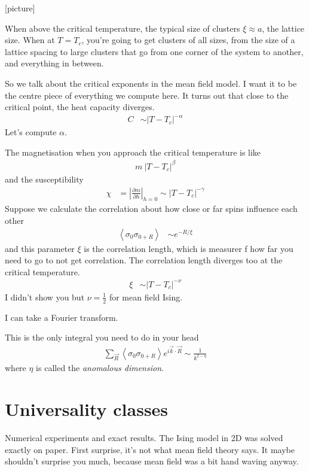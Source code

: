 [picture]

When above the critical temperature,
the typical size of clusters $\xi\approx a$,
the lattice size.
When at $T=T_c$,
you're going to get clusters of all sizes,
from the size of a lattice spacing to large clusters that go from one corner of
the system to another,
and everything in between.

So we talk about the critical exponents in the mean field model.
I want it to be the centre piece of everything we compute here.
It turns out that close to the critical point,
the heat capacity diverges.
\begin{align}
    C &\sim \left| T - T_c \right|^{-\alpha}
\end{align}
Let's compute $\alpha$.

The magnetisation when you approach the critical temperature is like
\begin{align}
    m ~ \left| T - T_c \right|^{\beta}
\end{align}
and the susceptibility
\begin{align}
    \chi &=
    \left| \frac{\partial m}{\partial h} \right|_{h=0}
    \sim
    \left| T - T_c \right|^{-\gamma}
\end{align}
Suppose we calculate the correlation
about how close or far spins influence each other
\begin{align}
    \left\langle
    \sigma_0
    \sigma_{0 + R}
    \right\rangle
    &\sim
    e^{-R/\xi}
\end{align}
and this parameter $\xi$ is the correlation length,
which is measurer f how far you need to go to not get correlation.
The correlation length diverges too at the critical temperature.
\begin{align}
    \xi &\sim
    \left| T - T_c\right|^{-\nu}
\end{align}
I didn't show you but $\nu=\frac{1}{2}$ for mean field Ising.

I can take a Fourier transform.

This is the only integral you need to do in your head
\begin{align}
    \sum_{\vec{R}}
    \left\langle
    \sigma_0
    \sigma_{0 + R}
    \right\rangle
    e^{i\vec{k}\cdot\vec{R}}
    \sim
    \frac{1}{k^{2 - \eta}}
\end{align}
where $\eta$ is called the \emph{anomalous dimension}.

\section{Universality classes}
Numerical experiments and exact results.
The Ising model in 2D was solved exactly on paper.
First surprise,
it's not what mean field theory says.
It maybe shouldn't surprise you much,
because mean field was a bit hand waving anyway.

